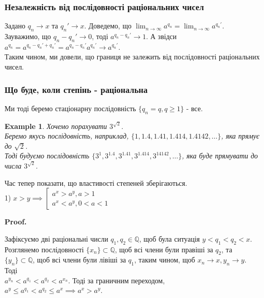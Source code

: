 \documentclass[a4paper, 14pt]{article}
\makeatletter
\def\qed{$\blacksquare$}
\theoremstyle{theoremdd}
\theoremstyle{theoremdd}
\theoremstyle{theoremdd}
\theoremstyle{theoremdd}
\newtheorem{example}[theorem]{Example}
\theoremstyle{theoremdd}
\theoremstyle{theoremdd}
\theoremstyle{theoremdd}
\theoremstyle{theoremdd}
\renewenvironment{proof}[1][Proof.\\]{\par
\pushQED{\hfill \qed}%
\normalfont \topsep6\p@\@plus6\p@\relax
\trivlist
\item\relax
{\bfseries
#1\@addpunct{.}}\hspace\labelsep\ignorespaces
}{%
\popQED\endtrivlist\@endpefalse
}
\makeatother
\begin{document}
\subsubsection*{Незалежність від послідовності раціональних чисел}
Задано $q_n \to x$ та $q_n' \to x$. Доведемо, що $\displaystyle\lim_{n \to \infty} a^{q_n} = \displaystyle\lim_{n \to \infty} a^{q_n'}$.\\
\iffalse
Зауважимо, що $q_n - q_n' \to 0$, тоді для $\varepsilon = 1: \exists N: \forall n \geq N: |q_n-q_n'| < 1$.\\
Тоді $|a^{q_n} - a^{q_n'}| = a^{q_n'}|a^{q_n-q_n'}-1| \leq a^{q_n'} 2|q_n-q_n'|(a-1) \overset{n \to \infty}{\longrightarrow} 0$.\\
Отже, дійсно,  $\displaystyle\lim_{n \to \infty} a^{q_n} = \displaystyle\lim_{n \to \infty} a^{q_n'}$, що підтверджує незалежність.
\fi
Зауважимо, що $q_n - q_n' \to 0$, тоді $a^{q_n - q_n'} \to 1$. А звідси $a^{q_n} = a^{q_n - q_n' + q_n'} = a^{q_n - q_n'} a^{q_n'} \to a^{q_n'}$.\\
Таким чином, ми довели, що границя не залежить від послідовності раціональних чисел.

\subsubsection*{Що буде, коли степінь - раціональна}
Ми тоді беремо стаціонарну послідовність $\{q_n = q, q \geq 1\}$ - все.

\begin{example}
Хочемо порахувати $3^{\sqrt{2}}$. \\ Беремо якусь послідовність, наприклад, $\{1,1.4,1.41,1.414,1.4142,\dots\}$, яка прямує до $\sqrt{2}$.\\
Тоді будуємо послідовність $\{3^1,3^{1.4},3^{1.41},3^{1.414},3^{14142},\dots\}$, яка буде прямувати до числа $3^{\sqrt{2}}$.
\\
\end{example}

Час тепер показати, що властивості степеней зберігаються.\\
1) $x > y \implies \left[ \begin{gathered} a^{x} > a^{y}, a>1 \\ a^{x} < a^{y}, 0<a<1 \end{gathered} \right.$
\begin{proof}
Зафіксуємо дві раціональні числи $q_1,q_2 \in \mathbb{Q}$, щоб була ситуація $y < q_1 < q_2 < x$.\\
Розглянемо послідовності $\{x_n\} \subset \mathbb{Q}$, щоб всі члени були правіші за $q_2$, та $\{y_n\} \subset \mathbb{Q}$, щоб всі члени були лівіші за $q_1$, таким чином, щоб $x_n \to x, y_n \to y$. Тоді\\
$a^{y_n} < a^{q_1} < a^{q_2} < a^{x_n}$. Тоді за граничним переходом, $a^y \leq a^{q_1} < a^{q_2} \leq a^x \implies a^x > a^y$.
\end{proof}
\end{document}
